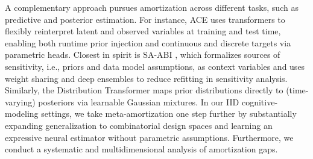 A complementary approach pursues amortization across different tasks, such as predictive and posterior estimation. For instance, ACE \citep{chang2025amortized} uses transformers to flexibly reinterpret latent and observed variables at training and test time, enabling both runtime prior injection and continuous and discrete targets via parametric heads. Closest in spirit is SA-ABI \citep{elsemuller2023sensitivity}, which formalizes sources of sensitivity, i.e., priors and data model assumptions, as context variables and uses weight sharing and deep ensembles to reduce refitting in sensitivity analysis. Similarly, the Distribution Transformer \citep{whittle2025distribution} maps prior distributions directly to (time-varying) posteriors via learnable Gaussian mixtures. In our IID cognitive-modeling settings, we take meta-amortization one step further by substantially expanding generalization to combinatorial design spaces and learning an expressive neural estimator without parametric assumptions. Furthermore, we conduct a systematic and multidimensional analysis of amortization gaps.
